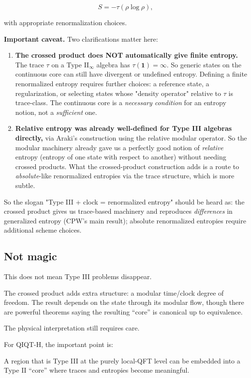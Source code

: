 \documentclass[11pt,a4paper]{article}
\newenvironment{qiqtquote}{\begin{mdframed}[style=quotestyle]}{\end{mdframed}}
\begin{document}
\[
S=-\tau(\rho\log\rho),
\]

with appropriate renormalization choices.

\textbf{Important caveat.} Two clarifications matter here:

\begin{enumerate}
  \item \textbf{The crossed product does NOT automatically give finite entropy.} The trace $\tau$ on a Type II$_\infty$ algebra has $\tau(\mathbf{1}) = \infty$. So generic states on the continuous core can still have divergent or undefined entropy. Defining a finite renormalized entropy requires further choices: a reference state, a regularization, or selecting states whose "density operator" relative to $\tau$ is trace-class. The continuous core is a \emph{necessary condition} for an entropy notion, not a \emph{sufficient} one.
  \item \textbf{Relative entropy was already well-defined for Type III algebras directly,} via Araki's construction using the relative modular operator. So the modular machinery already gave us a perfectly good notion of \emph{relative} entropy (entropy of one state with respect to another) without needing crossed products. What the crossed-product construction adds is a route to \emph{absolute}-like renormalized entropies via the trace structure, which is more subtle.
\end{enumerate}

So the slogan "Type III + clock = renormalized entropy" should be heard as: the crossed product gives us trace-based machinery and reproduces \emph{differences} in generalized entropy (CPW's main result); absolute renormalized entropies require additional scheme choices.

\subsection{Not magic}

This does not mean Type III problems disappear.

The crossed product adds extra structure: a modular time/clock degree of freedom. The result depends on the state through its modular flow, though there are powerful theorems saying the resulting “core” is canonical up to equivalence.

The physical interpretation still requires care.

For QIQT-H, the important point is:

\begin{qiqtquote}
A region that is Type III at the purely local-QFT level can be embedded into a Type II “core” where traces and entropies become meaningful.
\end{qiqtquote}
\end{document}
